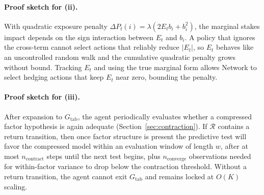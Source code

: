 \paragraph{Proof sketch for (ii).}
With quadratic exposure penalty $\Delta P_t(i)=\lambda(2E_t b_i + b_i^2)$, the
marginal stakes impact depends on the sign interaction between $E_t$ and $b_i$.
A policy that ignores the cross-term cannot select actions that reliably reduce
$|E_t|$, so $E_t$ behaves like an uncontrolled random walk and the cumulative
quadratic penalty grows without bound.  Tracking $E_t$ and using the true
marginal form allows Network to select hedging actions that keep $E_t$ near
zero, bounding the penalty.

\paragraph{Proof sketch for (iii).}
After expansion to $G_{\mathrm{tab}}$, the agent periodically evaluates whether a
compressed factor hypothesis is again adequate (Section~\ref{sec:contraction}).
If $\mathcal{R}$ contains a return transition, then once factor structure is
present the predictive test will favor the compressed model within an evaluation
window of length $w$, after at most $n_{\mathrm{contract}}$ steps until the next
test begins, plus $n_{\mathrm{converge}}$ observations needed for within-factor
variance to drop below the contraction threshold.  Without a return transition,
the agent cannot exit $G_{\mathrm{tab}}$ and remains locked at $O(K)$ scaling.
